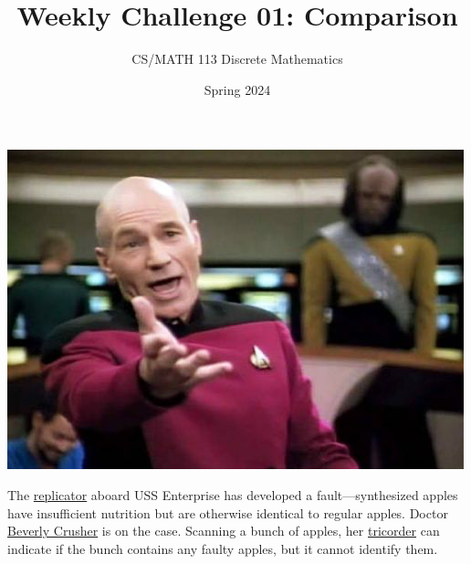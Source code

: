 \documentclass[a4paper]{exam}
\title{Weekly Challenge 01: Comparison}
\author{CS/MATH 113 Discrete Mathematics}
\date{Spring 2024}
\begin{document}
\maketitle

\begin{questions}
  
  \begin{minipage}{.3\linewidth}
  \centerline{\includegraphics[width=\textwidth]{picard}}
\end{minipage}
\begin{minipage}{.65\linewidth}
  The \href{https://en.wikipedia.org/wiki/Replicator_(Star_Trek)}{replicator} aboard USS Enterprise has developed a fault---synthesized apples have insufficient nutrition but are otherwise identical to regular apples. Doctor \href{https://memory-alpha.fandom.com/wiki/Beverly_Crusher}{Beverly Crusher} is on the case. Scanning a bunch of apples, her \href{https://en.wikipedia.org/wiki/Medical_tricorder}{tricorder} can indicate if the bunch contains any faulty apples, but it cannot identify them.
\end{minipage}

\begin{solution}
\end{solution}

\end{questions}
\end{document}
